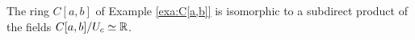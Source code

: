 


\begin{example}
	The ring $C[a,b]$ 
	of Example \ref{exa:C[a,b]}
	is isomorphic to a subdirect product of the fields 
	$C[a,b]/U_c\simeq\mathbb{R}$.
\end{example}


